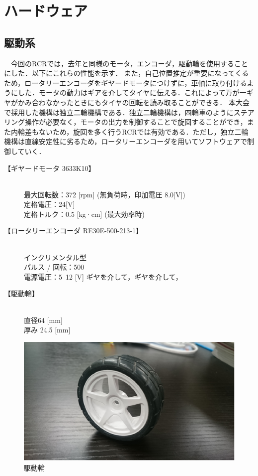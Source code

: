 \section{ハードウェア}
\subsection{駆動系}
　今回のRCRでは，去年と同様のモータ，エンコーダ，駆動輪を使用することにした．以下にこれらの性能を示す．
また，自己位置推定が重要になってくるため，ロータリーエンコーダをギヤードモータにつけずに，車軸に取り付けるようにした．モータの動力はギアを介してタイヤに伝える．これによって万が一ギヤがかみ合わなかったときにもタイヤの回転を読み取ることができる．
本大会で採用した機構は独立二輪機構である．独立二輪機構は，四輪車のようにステアリング操作が必要なく，モータの出力を制御することで旋回することができ，また内輪差もないため，旋回を多く行うRCRでは有効である．ただし，独立二輪機構は直線安定性に劣るため，ロータリーエンコーダを用いてソフトウェアで制御していく．

\begin{description}
 \item[【ギヤードモータ 3633K10】] \mbox{} \\ 
	    最大回転数：372 [rpm] (無負荷時，印加電圧 8.0[V]) \\
	    定格電圧：24[V] \\
	    定格トルク：0.5 [kg·cm] (最大効率時)        
 \item[【ロータリーエンコーダ RE30E-500-213-1】] \mbox{} \\
	    インクリメンタル型 \\
	    パルス / 回転：500 \\
	    電源電圧：5~12 [V] ギヤを介して，ギヤを介して，
 \item[【駆動輪】] \mbox{} \\
	    直径64 [mm] \\
	    厚み 24.5 [mm]
\end{description}


\begin{figure}[b]
 \begin{center}
  \includegraphics[scale=.5]{../kuwano/picture/picture1.eps}
  \caption{駆動輪}
 \end{center}
\end{figure}


